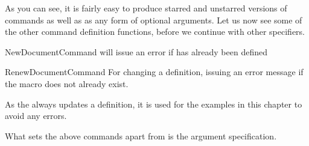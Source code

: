 

As you can see, it is fairly easy to produce starred and unstarred versions of commands as well as as any form of optional arguments. Let us now see some of the other command definition functions, before we continue with other specifiers.

\begin{docCommand}{NewDocumentCommand}{}
will issue an error if  has already been defined
\end{docCommand}

\begin{docCommand}{RenewDocumentCommand}{}
For changing a definition,
issuing an error message if the macro does
not already exist.
\end{docCommand}


As the \cmd{\DeclareDocumentCommand} always updates a definition, it is used for the examples in this chapter to avoid any errors.

What sets the above commands apart from \latexe \cmd{\newcommand} is the argument specification.





